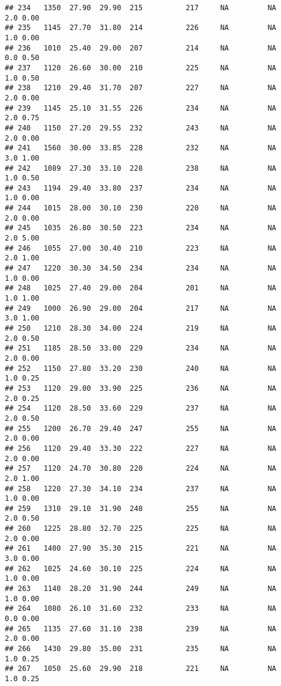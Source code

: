 \documentclass[
]{article}
\begin{document}
\begin{verbatim}
## 234   1350  27.90  29.90  215          217     NA         NA     2.0 0.00
## 235   1145  27.70  31.80  214          226     NA         NA     1.0 0.00
## 236   1010  25.40  29.00  207          214     NA         NA     0.0 0.50
## 237   1120  26.60  30.00  210          225     NA         NA     1.0 0.50
## 238   1210  29.40  31.70  207          227     NA         NA     2.0 0.00
## 239   1145  25.10  31.55  226          234     NA         NA     2.0 0.75
## 240   1150  27.20  29.55  232          243     NA         NA     2.0 0.00
## 241   1560  30.00  33.85  228          232     NA         NA     3.0 1.00
## 242   1089  27.30  33.10  228          238     NA         NA     1.0 0.50
## 243   1194  29.40  33.80  237          234     NA         NA     1.0 0.00
## 244   1015  28.00  30.10  230          220     NA         NA     2.0 0.00
## 245   1035  26.80  30.50  223          234     NA         NA     2.0 5.00
## 246   1055  27.00  30.40  210          223     NA         NA     2.0 1.00
## 247   1220  30.30  34.50  234          234     NA         NA     1.0 0.00
## 248   1025  27.40  29.00  204          201     NA         NA     1.0 1.00
## 249   1000  26.90  29.00  204          217     NA         NA     3.0 1.00
## 250   1210  28.30  34.00  224          219     NA         NA     2.0 0.50
## 251   1185  28.50  33.00  229          234     NA         NA     2.0 0.00
## 252   1150  27.80  33.20  230          240     NA         NA     1.0 0.25
## 253   1120  29.00  33.90  225          236     NA         NA     2.0 0.25
## 254   1120  28.50  33.60  229          237     NA         NA     2.0 0.50
## 255   1200  26.70  29.40  247          255     NA         NA     2.0 0.00
## 256   1120  29.40  33.30  222          227     NA         NA     2.0 0.00
## 257   1120  24.70  30.80  220          224     NA         NA     2.0 1.00
## 258   1220  27.30  34.10  234          237     NA         NA     1.0 0.00
## 259   1310  29.10  31.90  248          255     NA         NA     2.0 0.50
## 260   1225  28.80  32.70  225          225     NA         NA     2.0 0.00
## 261   1400  27.90  35.30  215          221     NA         NA     3.0 0.00
## 262   1025  24.60  30.10  225          224     NA         NA     1.0 0.00
## 263   1140  28.20  31.90  244          249     NA         NA     1.0 0.00
## 264   1080  26.10  31.60  232          233     NA         NA     0.0 0.00
## 265   1135  27.60  31.10  238          239     NA         NA     2.0 0.00
## 266   1430  29.80  35.00  231          235     NA         NA     1.0 0.25
## 267   1050  25.60  29.90  218          221     NA         NA     1.0 0.25

\end{verbatim}
\end{document}
